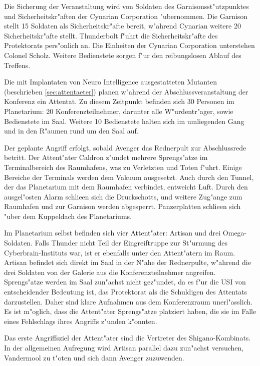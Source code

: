 Die Sicherung der Veranstaltung wird von Soldaten des Garnisonsst"utzpunktes und Sicherheitskr"aften der Cynarian Corporation "ubernommen. Die Garnison stellt 15 Soldaten als Sicherheitskr"afte bereit, w"ahrend Cynarian weitere 20 Sicherheitskr"afte stellt. Thunderbolt f"uhrt die Sicherheitskr"afte des Protektorats pers"onlich an. Die Einheiten der Cynarian Corporation unterstehen Colonel Scholz. Weitere Bedienstete sorgen f"ur den reibungslosen Ablauf des Treffens.


Die mit Implantaten von Neuro Intelligence ausgestatteten Mutanten (beschrieben \cref{sec:attentaeter}) planen w"ahrend der Abschlussveranstaltung der Konferenz ein Attentat. Zu diesem Zeitpunkt befinden sich 30 Personen im Planetarium: 20 Konferenzteilnehmer, darunter alle W"urdentr"ager, sowie Bedienstete im Saal. Weitere 10 Bedienstete halten sich im umliegenden Gang und in den R"aumen rund um den Saal auf.

Der geplante Angriff erfolgt, sobald Avenger das Rednerpult zur Abschlussrede betritt. Der Attent"ater Caldron z"undet mehrere Sprengs"atze im Terminalbereich des Raumhafens, was zu Verletzten und Toten f"uhrt. Einige Bereiche der Terminals werden dem Vakuum ausgesetzt. Auch durch den Tunnel, der das Planetarium mit dem Raumhafen verbindet, entweicht Luft. Durch den ausgel"osten Alarm schlie\3en sich die Druckschotts, und weitere Zug"ange zum Raumhafen und zur Garnison werden abgesperrt. Panzerplatten schlie\3en sich "uber dem Kuppeldach des Planetariums.

Im Planetarium selbst befinden sich vier Attent"ater: Artisan und drei Omega-Soldaten. Falls Thunder nicht Teil der Eingreiftruppe zur St"urmung des Cyberbrain-Instituts war, ist er ebenfalls unter den Attent"atern im Raum. Artisan befindet sich direkt im Saal in der N"ahe der Rednerpulte, w"ahrend die drei Soldaten von der Galerie aus die Konferenzteilnehmer angreifen. Sprengs"atze werden im Saal zun"achst nicht gez"undet, da es f"ur die USI von entscheidender Bedeutung ist, das Protektorat als die Schuldigen des Attentats darzustellen. Daher sind klare Aufnahmen aus dem Konferenzraum unerl"asslich. Es ist m"oglich, dass die Attent"ater Sprengs"atze platziert haben, die sie im Falle eines Fehlschlags ihres Angriffs z"unden k"onnten.

Das erste Angriffsziel der Attent"ater sind die Vertreter des Shigano-Kombinats. In der allgemeinen Aufregung wird Artisan parallel dazu zun"achst versuchen, Vandermool zu t"oten und sich dann Avenger zuzuwenden. 

